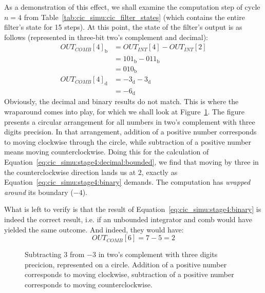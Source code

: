 As a  demonstration of this effect,  we shall examine the  computation step of
cycle $n = 4$  from Table~\ref{tab:cic_simu:cic_filter_states} (which contains
the  entire filter's  state for  15 steps). At  this point,  the state  of the
filter's output is  as follows (represented in three-bit  two's complement and
decimal):
\begin{align}
    OUT_{COMB}[4]_\mathrm{b} &= OUT_{INT}[4] - OUT_{INT}[2]     \nonumber\\
                             &= 101_\mathrm{b} - 011_\mathrm{b} \nonumber\\
                             &= 010_\mathrm{b}
    \label{eq:cic_simu:stage4:binary} \\
    OUT_{COMB}[4]_\mathrm{d} &= -3_\mathrm{d} - 3_\mathrm{d}    \nonumber\\
                             &= -6_\mathrm{d}
    \label{eq:cic_simu:stage4:decimal:bounded}
\end{align}
Obviously,   the  decimal   and   binary  results   do   not  match. This   is
where   the  wraparound   comes   into   play,  for   which   we  shall   look
at  Figure~\ref{fig:cic_simu:twos_complement_circle}. The  figure  presents  a
circular  arrangement  for   all  numbers  in  two's   complement  with  three
digits  precision.   In  that  arrangement,  addition  of  a  positive  number
corresponds to  moving clockwise  through the circle,  while subtraction  of a
positive number means moving  counterclockwise. Doing this for the calculation
of  Equation~\ref{eq:cic_simu:stage4:decimal:bounded},  we  find  that  moving
by  three  in  the  counterclockwise   direction  lands  us  at  $2$,  exactly
as   Equation~\ref{eq:cic_simu:stage4:binary}  demands. The   computation  has
\emph{wrapped around} its boundary ($-4$).

What     is     left    to     verify     is     that    the     result     of
Equation~\ref{eq:cic_simu:stage4:binary} is indeed the correct result, i.e. if
an  unbounded integrator  and comb  would have  yielded the  same outcome. And
indeed, they would have:
\begin{equation}
    \label{eq:cic_simu:stage4:decimal:unbounded}
    OUT_{COMB}[6] = 7 - 5 = 2
\end{equation}

\begin{figure}
    \centering
    
    \caption[Two's Complement Circle]{%
        Subtracting  $3$  from $-3$  in  two's  complement with  three  digits
        precicion,  represented on  a  circle. Addition of  a positive  number
        corresponds  to moving  clockwise,  subtraction of  a positive  number
        corresponds to moving counterclockwise.%
    }
    \label{fig:cic_simu:twos_complement_circle}
\end{figure}

